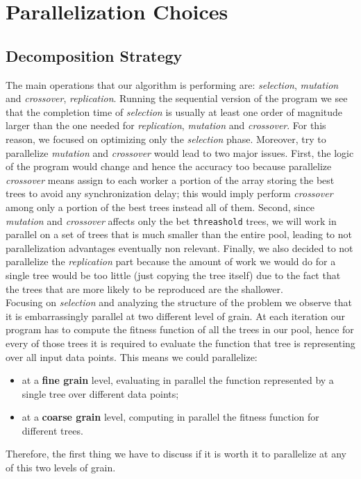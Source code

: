 \documentclass[10pt]{article}
\numberwithin{equation}{section}
\begin{document}
\section{Parallelization Choices}
\subsection{Decomposition Strategy}
The main operations that our algorithm is performing are: \emph{selection}, \emph{mutation} and \emph{crossover}, \emph{replication}. Running the sequential version of the program we see that the completion time of \emph{selection} is usually at least one order of magnitude larger than the one needed for \emph{replication}, \emph{mutation} and \emph{crossover}. For this reason, we focused on optimizing only the \emph{selection} phase. Moreover, try to parallelize \emph{mutation} and \emph{crossover} would lead to two major issues. First, the logic of the program would change and hence the accuracy too because parallelize \emph{crossover} means assign to each worker a portion of the array storing the best trees to avoid any synchronization delay; this would imply perform \emph{crossover} among only a portion of the best trees instead all of them. Second, since \emph{mutation} and \emph{crossover} affects only the bet \verb|threashold| trees, we will work in parallel on a set of trees that is much smaller than the entire pool, leading to not parallelization advantages eventually non relevant. Finally, we also decided to not parallelize the \emph{replication} part because the amount of work we would do for a single tree would be too little (just copying the tree itself) due to the fact that the trees that are more likely to be reproduced are the shallower.\\
Focusing on \emph{selection} and analyzing the structure of the problem we observe that it is embarrassingly parallel at two different level of grain. At each iteration our program has to compute the fitness function of all the trees in our pool, hence for every of those trees it is required to evaluate the function that tree is representing over all input data points. This means we could parallelize:
\begin{itemize}
	\item at a \textbf{fine grain} level, evaluating in parallel the function represented by a single tree over different data points;
	\item at a \textbf{coarse grain} level, computing in parallel the fitness function for different trees.
\end{itemize}
Therefore, the first thing we have to discuss if it is worth it to parallelize at any of this two levels of grain.
\end{document}
